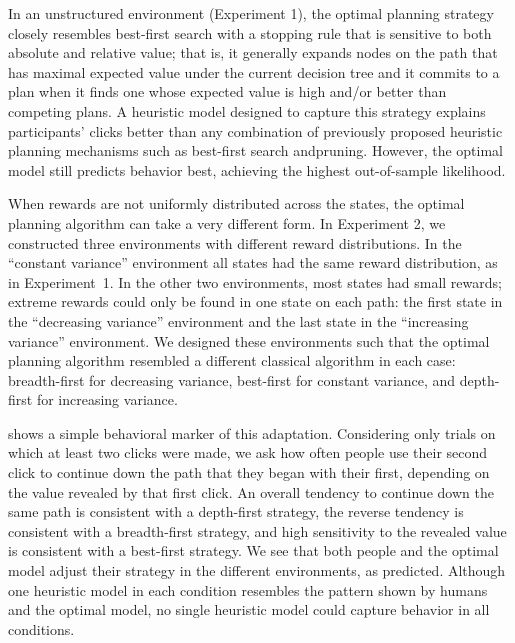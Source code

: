 \documentclass[11pt,a4paperpaper,]{article}
\begin{document}
In an unstructured environment (Experiment 1), the optimal planning strategy closely resembles best-first search with a stopping rule that is sensitive to both absolute and relative value; that is, it generally expands nodes on the path that has maximal expected value under the current decision tree and it commits to a plan when it finds one whose expected value is high and/or better than competing plans. A heuristic model designed to capture this strategy explains participants' clicks better than any combination of previously proposed heuristic planning mechanisms such as best-first search andpruning. However, the optimal model still predicts behavior best, achieving the highest out-of-sample likelihood.

When rewards are not uniformly distributed across the states, the optimal planning algorithm can take a very different form. In Experiment 2, we constructed three environments with different reward distributions. In the ``constant variance'' environment all states had the same reward distribution, as in Experiment~1. In the other two environments, most states had small rewards; extreme rewards could only be found in one state on each path: the first state in the ``decreasing variance'' environment and the last state in the ``increasing variance'' environment. We designed these environments such that the optimal planning algorithm resembled a different classical algorithm in each case: breadth-first for decreasing variance, best-first for constant variance, and depth-first for increasing variance. 

 shows a simple behavioral marker of this adaptation. Considering only trials on which at least two clicks were made, we ask how often people use their second click to continue down the path that they began with their first, depending on the value revealed by that first click. An overall tendency to continue down the same path is consistent with a depth-first strategy, the reverse tendency is consistent with a breadth-first strategy, and high sensitivity to the revealed value is consistent with a best-first strategy. We see that both people and the optimal model adjust their strategy in the different environments, as predicted. Although one heuristic model in each condition resembles the pattern shown by humans and the optimal model, no single heuristic model could capture behavior in all conditions. 
\end{document}
